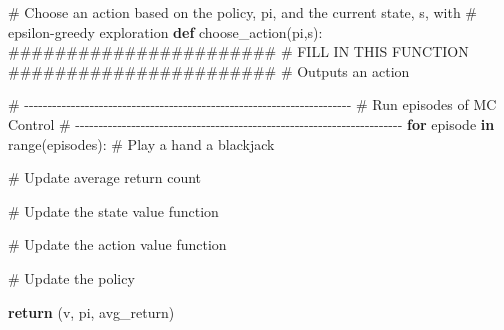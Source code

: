 \documentclass[
  letterpaper,
  DIV=11,
  numbers=noendperiod]{scrartcl}
\newenvironment{Shaded}{\begin{snugshade}}{\end{snugshade}}
\newcommand{\BuiltInTok}[1]{\textcolor[rgb]{0.00,0.23,0.31}{#1}}
\newcommand{\CommentTok}[1]{\textcolor[rgb]{0.37,0.37,0.37}{#1}}
\newcommand{\ControlFlowTok}[1]{\textcolor[rgb]{0.00,0.23,0.31}{\textbf{#1}}}
\newcommand{\KeywordTok}[1]{\textcolor[rgb]{0.00,0.23,0.31}{\textbf{#1}}}
\newcommand{\NormalTok}[1]{\textcolor[rgb]{0.00,0.23,0.31}{#1}}
\begin{document}
\begin{Shaded}
\begin{Highlighting}[]
    \CommentTok{\# Choose an action based on the policy, pi, and the current state, s, with }
    \CommentTok{\#  epsilon{-}greedy exploration}
    \KeywordTok{def}\NormalTok{ choose\_action(pi,s):}
        \CommentTok{\#\#\#\#\#\#\#\#\#\#\#\#\#\#\#\#\#\#\#\#\#\#\#}
        \CommentTok{\# FILL IN THIS FUNCTION}
        \CommentTok{\#\#\#\#\#\#\#\#\#\#\#\#\#\#\#\#\#\#\#\#\#\#\#}
        \CommentTok{\# Outputs an action}
    
    \CommentTok{\# {-}{-}{-}{-}{-}{-}{-}{-}{-}{-}{-}{-}{-}{-}{-}{-}{-}{-}{-}{-}{-}{-}{-}{-}{-}{-}{-}{-}{-}{-}{-}{-}{-}{-}{-}{-}{-}{-}{-}{-}{-}{-}{-}{-}{-}{-}{-}{-}{-}{-}{-}{-}{-}{-}{-}{-}{-}{-}{-}{-}{-}{-}{-}{-}{-}{-}{-}{-}{-}{-}}
    \CommentTok{\# Run episodes of MC Control    }
    \CommentTok{\# {-}{-}{-}{-}{-}{-}{-}{-}{-}{-}{-}{-}{-}{-}{-}{-}{-}{-}{-}{-}{-}{-}{-}{-}{-}{-}{-}{-}{-}{-}{-}{-}{-}{-}{-}{-}{-}{-}{-}{-}{-}{-}{-}{-}{-}{-}{-}{-}{-}{-}{-}{-}{-}{-}{-}{-}{-}{-}{-}{-}{-}{-}{-}{-}{-}{-}{-}{-}{-}{-}}
    \ControlFlowTok{for}\NormalTok{ episode }\KeywordTok{in} \BuiltInTok{range}\NormalTok{(episodes):}
        \CommentTok{\# Play a hand a blackjack       }
        
        \CommentTok{\# Update average return count}
        
        \CommentTok{\# Update the state value function}
        
        \CommentTok{\# Update the action value function }
        
        \CommentTok{\# Update the policy}

    \ControlFlowTok{return}\NormalTok{ (v, pi, avg\_return)}
\end{Highlighting}
\end{Shaded}
\end{document}
